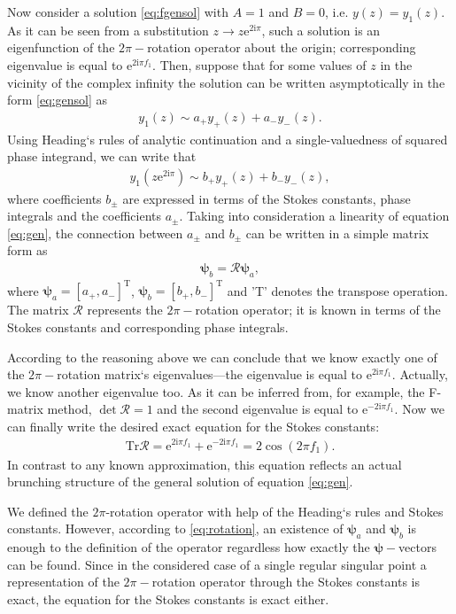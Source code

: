 \documentclass[aip,jmp,reprint]{revtex4-1}
\def\rmi{\mathrm{i}}
\def\rme{\mathrm{e}}
\def\psii{\bm{\psi}}
\def\R{\bm{\mathcal{R}}}
\def\T{\mathrm{T}}
\def\Tr{\mathrm{Tr}}
\begin{document}
Now consider a solution \eqref{eq:fgensol} with $A=1$ and $B=0$, i.e. $y(z)=y_1(z)$. 
As it can be seen from a substitution \mbox{$z \rightarrow z \rme^{2 \rmi \pi}$}, 
such a solution is an eigenfunction of the $2\pi-$rotation operator about the origin; 
corresponding eigenvalue is equal to $\rme^{2 \rmi \pi f_1}$.  
Then, suppose that for some values of $z$ in the vicinity of the complex infinity 
the solution can be written asymptotically in the form \eqref{eq:gensol} as
\begin{eqnarray}
y_1(z) \sim a_+y_+(z) + a_-y_-(z).
\end{eqnarray}
Using Heading`s rules of analytic continuation\cite{heading, rwbook} and a single-valuedness 
of squared phase integrand, we can write that
\begin{eqnarray}
y_1(z \rme^{2 \rmi \pi}) \sim b_+y_+(z) + b_-y_-(z),
\end{eqnarray}
where coefficients $b_{\pm}$ are expressed in terms of the Stokes constants, phase integrals and 
the coefficients $a_{\pm}$. Taking into consideration a linearity of equation \eqref{eq:gen}, 
the connection between $a_{\pm}$ and $b_{\pm}$ can be written in a simple matrix form as
\begin{eqnarray}
\psii_b = \R \psii_a,
\label{eq:rotation}
\end{eqnarray}
where $\psii_a = [{a_+,a_-}]^{\T}$, $\psii_b = [{b_+,b_-}]^{\T}$ and 'T' denotes the transpose operation.
The matrix $\R$ represents the $2\pi-$rotation operator; it is known in terms of
the Stokes constants and corresponding phase integrals. 

According to the reasoning above we can conclude
that we know exactly one of the $2\pi-$rotation matrix`s eigenvalues---the eigenvalue is 
equal to $\rme^{2 \rmi \pi f_1}$. Actually, we know another eigenvalue too. 
As it can be inferred from, for example, the F-matrix method\cite{frbook}, $\det\R=1$ and the second eigenvalue is equal 
to $\rme^{-2 \rmi \pi f_1}$. Now we can finally write the desired exact equation for the Stokes constants:
\begin{eqnarray}
\Tr\R = \rme^{2 \rmi \pi f_1} + \rme^{-2 \rmi \pi f_1} = 2 \cos(2 \pi f_1).
\label{eq:main}
\end{eqnarray}
In contrast to any known approximation, this equation reflects an actual brunching structure 
of the general solution of equation \eqref{eq:gen}. 

We defined the $2\pi$-rotation operator with help of the Heading`s rules and Stokes constants. However, 
according to \eqref{eq:rotation}, an existence of $\psii_a$ and $\psii_b$ is enough to the definition of
the operator regardless how exactly the $\psii-$vectors can be found. Since in the considered case of a 
single regular singular point a representation of the $2\pi-$rotation operator through the Stokes constants 
is exact, the equation for the Stokes constants is exact either. 
\end{document}
